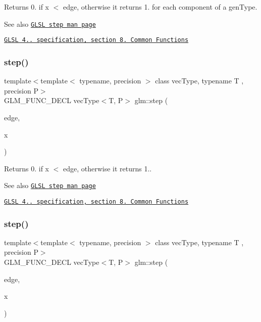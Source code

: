 Returns 0. if x $<$ edge, otherwise it returns 1. for each component of a gen\+Type.

\begin{DoxySeeAlso}{See also}
\href{http://www.opengl.org/sdk/docs/manglsl/xhtml/step.xml}{\tt G\+L\+SL step man page} 

\href{http://www.opengl.org/registry/doc/GLSLangSpec.4.20.8.pdf}{\tt G\+L\+SL 4.. specification, section 8. Common Functions} 
\end{DoxySeeAlso}
\mbox{\label{group__core__func__common_gaf15b74ab672af2c7d7b535a9b4803700}} 
\subsubsection{\texorpdfstring{step()}{step()}\hspace{0.1cm}{\footnotesize\ttfamily [2/3]}}
{\footnotesize\ttfamily template$<$template$<$ typename, precision $>$ class vec\+Type, typename T , precision P$>$ \\
G\+L\+M\+\_\+\+F\+U\+N\+C\+\_\+\+D\+E\+CL vec\+Type$<$T, P$>$ glm\+::step (\begin{DoxyParamCaption}\item[{T}]{edge,  }\item[{vec\+Type$<$ T, P $>$ const \&}]{x }\end{DoxyParamCaption})}

Returns 0. if x $<$ edge, otherwise it returns 1..

\begin{DoxySeeAlso}{See also}
\href{http://www.opengl.org/sdk/docs/manglsl/xhtml/step.xml}{\tt G\+L\+SL step man page} 

\href{http://www.opengl.org/registry/doc/GLSLangSpec.4.20.8.pdf}{\tt G\+L\+SL 4.. specification, section 8. Common Functions} 
\end{DoxySeeAlso}
\mbox{\label{group__core__func__common_ga6d84170051fb87c183c38883ec85b411}} 
\subsubsection{\texorpdfstring{step()}{step()}\hspace{0.1cm}{\footnotesize\ttfamily [3/3]}}
{\footnotesize\ttfamily template$<$template$<$ typename, precision $>$ class vec\+Type, typename T , precision P$>$ \\
G\+L\+M\+\_\+\+F\+U\+N\+C\+\_\+\+D\+E\+CL vec\+Type$<$T, P$>$ glm\+::step (\begin{DoxyParamCaption}\item[{vec\+Type$<$ T, P $>$ const \&}]{edge,  }\item[{vec\+Type$<$ T, P $>$ const \&}]{x }\end{DoxyParamCaption})}

